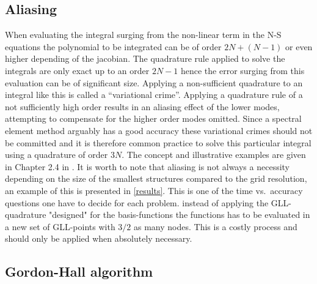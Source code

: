 

\subsection{Aliasing}

When evaluating the integral surging from the non-linear term in the N-S equations 
the polynomial to be integrated can be of order $2N+(N-1)$ or even higher depending of the jacobian.
The quadrature rule applied to solve the integrals are only exact up to an order $2N-1$
hence the error surging from this evaluation can be of significant size.
Applying a non-sufficient quadrature to an integral like this is called a ``variational
crime''. Applying a quadrature rule of a not sufficiently high order results in an 
aliasing effect of the lower modes, attempting to compensate for the higher order modes omitted. 
Since a spectral element method arguably has a good accuracy these variational crimes should 
not be committed and it is therefore common practice to solve this particular integral using a
quadrature of order $3N$. The concept and illustrative examples are given in Chapter 2.4 in 
\cite{Karniadakis}. It is worth to note that aliasing is not always a necessity depending on 
the size of the smallest structures compared to the grid resolution, an example of this
is presented in \cref{results}.
This is one of the time vs.\ accuracy questions one have to decide for each problem. 
instead of applying the GLL-quadrature "designed" for the basis-functions the functions
has to be evaluated in a new set of GLL-points with $3/2$ as many nodes. This is a costly 
process and should only be applied when absolutely necessary. 


\subsection{Gordon-Hall algorithm} \label{GH}


